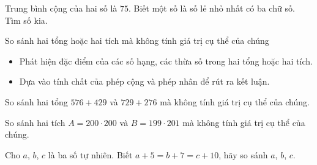 \begin{vd}%
	Trung bình cộng của hai số là $75$. Biết một số là số lẻ nhỏ nhất có ba chữ số. Tìm số kia.
\end{vd}

	\begin{dang}{So sánh hai tổng hoặc hai tích mà không tính giá trị cụ thể của chúng}
		\begin{itemize}
			\item Phát hiện đặc điểm của các số hạng, các thừa số trong hai tổng hoặc hai tích.
			\item Dựa vào tính chất của phép cộng và phép nhân để rút ra kết luận.
		\end{itemize}
	\end{dang}
	
\begin{vd}%
	So sánh hai tổng $576 + 429$ và $729 + 276$ mà không tính giá trị cụ thể của chúng.
\end{vd}

\begin{vd}%
	So sánh hai tích $A = 200 \cdot 200$ và $B = 199 \cdot 201$ mà không tính giá trị cụ thể của chúng.
\end{vd}

\begin{vd}%
	Cho $a$, $b$, $c$ là ba số tự nhiên. Biết $a + 5 = b + 7 = c + 10$, hãy so sánh $a$, $b$, $c$.
\end{vd}

